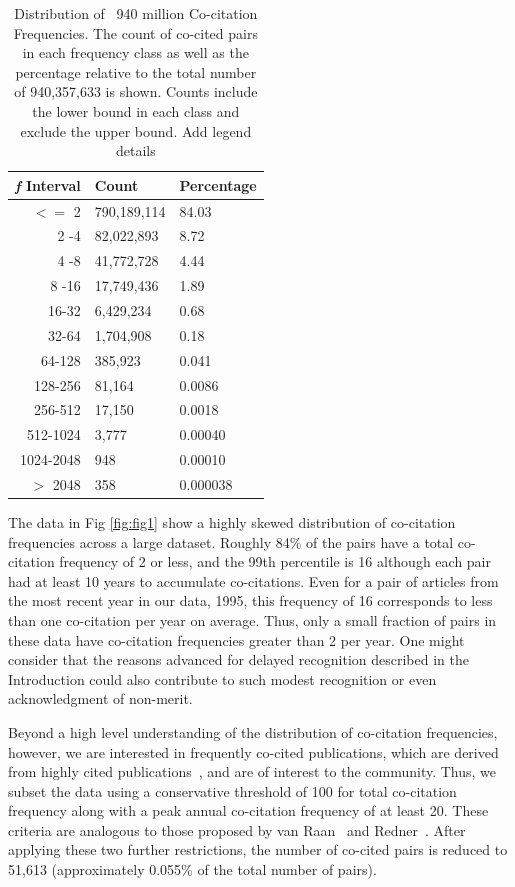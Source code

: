 \documentclass[utf8]{frontiersSCNS}
\newcommand\Tstrut{\rule{0pt}{2.9ex}} %
\begin{document}
\begin{table}[ht]
\caption{Distribution of ~940 million Co-citation Frequencies. The count of co-cited pairs in each frequency class as well as the percentage relative to the total number of 940,357,633 is shown. Counts include the lower bound in each class and exclude the upper bound. Add legend details}%
\centering %
\begin{center}
\begin{tabular}{rll} 
\emph{f} Interval & Count & Percentage \\
\hline %
$<=$ 2 & 790,189,114 & 84.03 \Tstrut\\ 
2 -4 & 82,022,893 & 8.72 \\
4 -8 & 41,772,728 & 4.44 \\
8 -16 & 17,749,436 & 1.89 \\
16-32 & 6,429,234 & 0.68\\
32-64 & 1,704,908 & 0.18\\
64-128 & 385,923 & 0.041\\
128-256 & 81,164 & 0.0086\\ 
256-512 & 17,150 & 0.0018\\
512-1024 & 3,777 & 0.00040\\
1024-2048 & 948 & 0.00010\\ 
$> $ 2048 & 358 & 0.000038\\   
\hline 
\end{tabular}
\end{center}
\label{tab:table1} %
\end{table}


The data in Fig \ref{fig:fig1} show a highly skewed distribution of co-citation frequencies across a large dataset. Roughly 84\% of the pairs have a total co-citation frequency of 2 or less, and the 99th percentile is 16 although each pair had at least 10 years to accumulate co-citations. Even for a pair of articles from the most recent year in our data, 1995, this frequency of 16 corresponds to less than one co-citation per year on average. Thus, only a small fraction of pairs in these data have co-citation frequencies greater than 2 per year. One might consider that the reasons advanced for delayed recognition described in the Introduction could also contribute to such modest recognition or even acknowledgment of non-merit.

Beyond a high level understanding of the distribution of co-citation frequencies, however, we are interested in frequently co-cited publications, which are derived from highly cited publications~\citep{Small1973}, and 
are of interest to the community.  Thus, we subset the data using a conservative threshold of 100 for total co-citation frequency along with a peak annual co-citation frequency of at least 20. These criteria are analogous to those proposed by van Raan~\citep{Raan2004} and Redner~\citep{redner_2005}. After applying these two further restrictions, the number of co-cited pairs is reduced to 51,613 (approximately 0.055\% of the total number of pairs).
\end{document}
